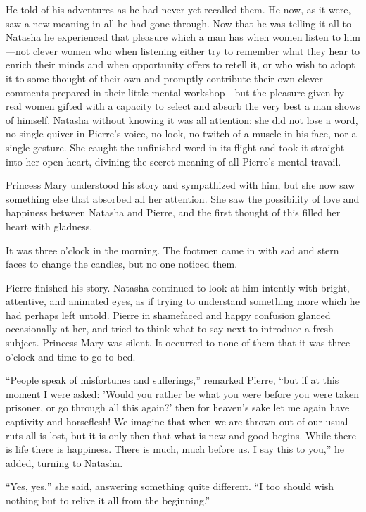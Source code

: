 He told of his adventures as he had never yet recalled them. He
now, as it were, saw a new meaning in all he had gone
through. Now that he was telling it all to Natasha he experienced
that pleasure which a man has when women listen to him---not
clever women who when listening either try to remember what they
hear to enrich their minds and when opportunity offers to retell
it, or who wish to adopt it to some thought of their own and
promptly contribute their own clever comments prepared in their
little mental workshop---but the pleasure given by real women
gifted with a capacity to select and absorb the very best a man
shows of himself.  Natasha without knowing it was all attention:
she did not lose a word, no single quiver in Pierre's voice, no
look, no twitch of a muscle in his face, nor a single
gesture. She caught the unfinished word in its flight and took it
straight into her open heart, divining the secret meaning of all
Pierre's mental travail.

Princess Mary understood his story and sympathized with him, but
she now saw something else that absorbed all her attention. She
saw the possibility of love and happiness between Natasha and
Pierre, and the first thought of this filled her heart with
gladness.

It was three o'clock in the morning. The footmen came in with sad
and stern faces to change the candles, but no one noticed them.

Pierre finished his story. Natasha continued to look at him
intently with bright, attentive, and animated eyes, as if trying
to understand something more which he had perhaps left
untold. Pierre in shamefaced and happy confusion glanced
occasionally at her, and tried to think what to say next to
introduce a fresh subject. Princess Mary was silent. It occurred
to none of them that it was three o'clock and time to go to bed.

``People speak of misfortunes and sufferings,'' remarked Pierre,
``but if at this moment I were asked: 'Would you rather be what
you were before you were taken prisoner, or go through all this
again?' then for heaven's sake let me again have captivity and
horseflesh! We imagine that when we are thrown out of our usual
ruts all is lost, but it is only then that what is new and good
begins. While there is life there is happiness. There is much,
much before us. I say this to you,'' he added, turning to
Natasha.

``Yes, yes,'' she said, answering something quite different. ``I
too should wish nothing but to relive it all from the
beginning.''

